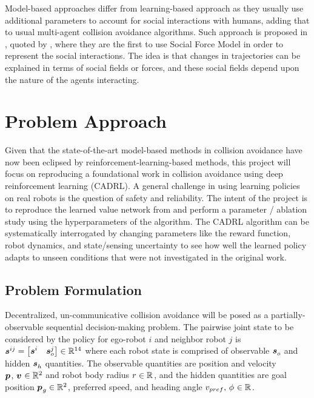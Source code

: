 \documentclass[conference]{IEEEtran}
\begin{document}
Model-based approaches differ from learning-based approach as they usually use additional parameters to account for social interactions with humans, adding that to usual multi-agent collision avoidance algorithms. Such approach is proposed in \cite{Ferrer}, quoted by \cite{SocialCA}, where they are the first to use Social Force Model in order to represent the social interactions. The idea is that changes in trajectories can be explained in terms of social fields or forces, and these social fields depend upon the nature of the agents interacting.

\section{Problem Approach}
Given that the state-of-the-art model-based methods in collision avoidance have now been eclipsed by reinforcement-learning-based methods, this project will focus on reproducing a foundational work in collision avoidance using deep reinforcement learning (CADRL). A general challenge in using learning policies on real robots is the question of safety and reliability. The intent of the project is to reproduce the learned value network from \cite{chen2017cadrl} and perform a parameter / ablation study using the hyperparameters of the algorithm. The CADRL algorithm can be systematically interrogated by changing parameters like the reward function, robot dynamics, and state/sensing uncertainty to see how well the learned policy adapts to unseen conditions that were not investigated in the original work.

\subsection{Problem Formulation}
Decentralized, un-communicative collision avoidance will be posed as a partially-observable sequential decision-making problem. The pairwise joint state to be considered by the policy for ego-robot $i$ and neighbor robot $j$ is $\boldsymbol{s}^{ij}_{}=\begin{bmatrix} \boldsymbol{s}^{i}_{} & \boldsymbol{s}^{j}_{o} \end{bmatrix}\in \mathbb{R}^{14}$ where each robot state is comprised of observable $\boldsymbol{s}^{}_{o}$ and hidden $\boldsymbol{s}^{}_{h}$ quantities. The observable quantities are position and velocity $\boldsymbol{p_{}}_{}, \,  \boldsymbol{v_{}}_{} \in \mathbb{R}^{2}$ and robot body radius $r_{} \in \mathbb{R}^{}$, and the hidden quantities are goal position $\boldsymbol{p_{}}_{g} \in \mathbb{R}^{2}$, preferred speed, and heading angle $v_{pref}, \, \phi_{}\in \mathbb{R}^{}$.
\end{document}
